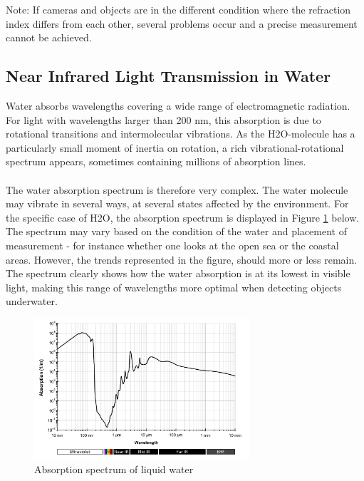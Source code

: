 Note: If cameras and objects are in the different condition where the refraction index differs from each other, several problems occur and a precise measurement cannot be achieved.

\subsection{Near Infrared Light Transmission in Water}
Water absorbs wavelengths covering a wide range of electromagnetic radiation. For light with wavelengths larger than 200 nm, this absorption is due to rotational transitions and intermolecular vibrations. As the H2O-molecule has a particularly small moment of inertia on rotation, a rich vibrational-rotational spectrum appears, sometimes containing millions of absorption lines. 
\\\\
The water absorption spectrum is therefore very complex. The water molecule may vibrate in several ways, at several states affected by the environment. For the specific case of H2O, the absorption spectrum is displayed in Figure \ref{fig:absspec} below. The spectrum may vary based on the condition of the water and placement of measurement - for instance whether one looks at the open sea or the coastal areas. However, the trends represented in the figure, should more or less remain. The spectrum clearly shows how the water absorption is at its lowest in visible light, making this range of wavelengths more optimal when detecting objects underwater.

\begin{figure}[H]
    \centering
    \includegraphics[width=8cm]{Images/theory/Absorption_spectrum_of_liquid_water.png}
    \caption{Absorption spectrum of liquid water}
    \label{fig:absspec}
\end{figure}

